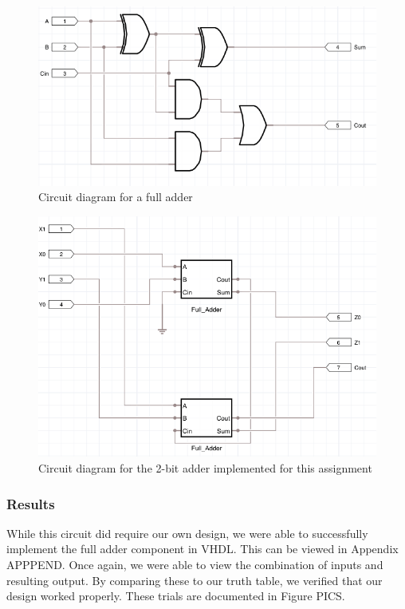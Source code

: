 \documentclass[11pt]{article}
\begin{document}
\begin{figure}
	\includegraphics[width=\textwidth]{report_images/img3}
	\caption{\label{fig:figure-name}Circuit diagram for a full adder}
\end{figure}

\begin{figure}
	\includegraphics[width=\textwidth]{report_images/img4}
	\caption{\label{fig:figure-name}Circuit diagram for the 2-bit adder implemented for this assignment}
\end{figure}

\subsubsection{Results}

While this circuit did require our own design, we were able to successfully implement the full adder component in VHDL. This can be viewed in Appendix APPPEND. Once again, we were able to view the combination of inputs and resulting output. By comparing these to our truth table, we verified that our design worked properly. These trials are documented in Figure PICS.
\end{document}
